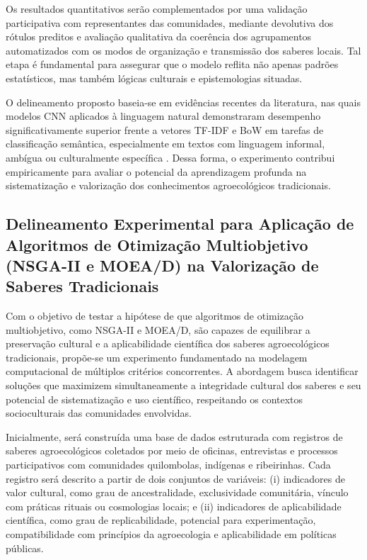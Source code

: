 Os resultados quantitativos serão complementados por uma validação participativa com representantes das comunidades, mediante devolutiva dos rótulos preditos e avaliação qualitativa da coerência dos agrupamentos automatizados com os modos de organização e transmissão dos saberes locais. Tal etapa é fundamental para assegurar que o modelo reflita não apenas padrões estatísticos, mas também lógicas culturais e epistemologias situadas.

O delineamento proposto baseia-se em evidências recentes da literatura, nas quais modelos CNN aplicados à linguagem natural demonstraram desempenho significativamente superior frente a vetores TF-IDF e BoW em tarefas de classificação semântica, especialmente em textos com linguagem informal, ambígua ou culturalmente específica \cite{Kamyab2021,Souza2022,Yeasmin2022}. Dessa forma, o experimento contribui empiricamente para avaliar o potencial da aprendizagem profunda na sistematização e valorização dos conhecimentos agroecológicos tradicionais.


\subsection{Delineamento Experimental para Aplicação de Algoritmos de Otimização Multiobjetivo (NSGA-II e MOEA/D) na Valorização de Saberes Tradicionais}

Com o objetivo de testar a hipótese de que algoritmos de otimização multiobjetivo, como NSGA-II e MOEA/D, são capazes de equilibrar a preservação cultural e a aplicabilidade científica dos saberes agroecológicos tradicionais, propõe-se um experimento fundamentado na modelagem computacional de múltiplos critérios concorrentes. A abordagem busca identificar soluções que maximizem simultaneamente a integridade cultural dos saberes e seu potencial de sistematização e uso científico, respeitando os contextos socioculturais das comunidades envolvidas.

Inicialmente, será construída uma base de dados estruturada com registros de saberes agroecológicos coletados por meio de oficinas, entrevistas e processos participativos com comunidades quilombolas, indígenas e ribeirinhas. Cada registro será descrito a partir de dois conjuntos de variáveis: (i) indicadores de valor cultural, como grau de ancestralidade, exclusividade comunitária, vínculo com práticas rituais ou cosmologias locais; e (ii) indicadores de aplicabilidade científica, como grau de replicabilidade, potencial para experimentação, compatibilidade com princípios da agroecologia e aplicabilidade em políticas públicas.

